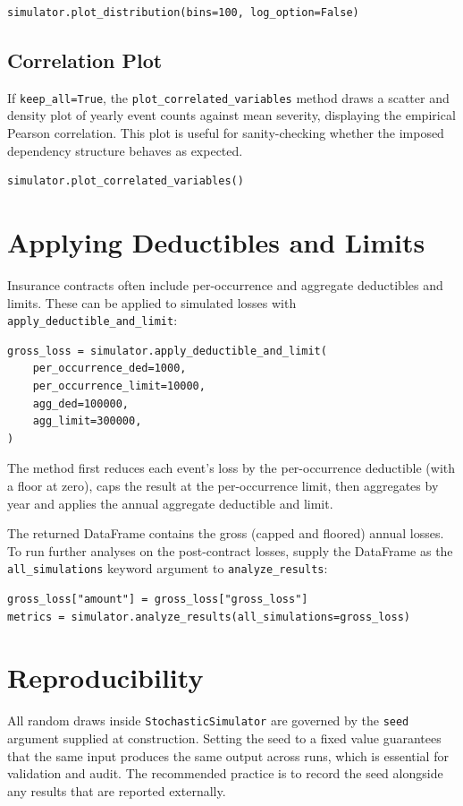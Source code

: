 \begin{lstlisting}[style=pythonstyle]
simulator.plot_distribution(bins=100, log_option=False)
\end{lstlisting}

\subsection{Correlation Plot}

If \texttt{keep\_all=True}, the \texttt{plot\_correlated\_variables}
method draws a scatter and density plot of yearly event counts against
mean severity, displaying the empirical Pearson correlation. This plot
is useful for sanity-checking whether the imposed dependency structure
behaves as expected.

\begin{lstlisting}[style=pythonstyle]
simulator.plot_correlated_variables()
\end{lstlisting}

\section{Applying Deductibles and Limits}
\label{sec:deductibles_and_limits}

Insurance contracts often include per-occurrence and aggregate
deductibles and limits. These can be applied to simulated losses with
\texttt{apply\_deductible\_and\_limit}:

\begin{lstlisting}[style=pythonstyle]
gross_loss = simulator.apply_deductible_and_limit(
    per_occurrence_ded=1000,
    per_occurrence_limit=10000,
    agg_ded=100000,
    agg_limit=300000,
)
\end{lstlisting}

The method first reduces each event's loss by the per-occurrence
deductible (with a floor at zero), caps the result at the per-occurrence
limit, then aggregates by year and applies the annual aggregate
deductible and limit.

The returned DataFrame contains the gross (capped and floored) annual
losses. To run further analyses on the post-contract losses, supply the
DataFrame as the \texttt{all\_simulations} keyword argument to
\texttt{analyze\_results}:

\begin{lstlisting}[style=pythonstyle]
gross_loss["amount"] = gross_loss["gross_loss"]
metrics = simulator.analyze_results(all_simulations=gross_loss)
\end{lstlisting}

\section{Reproducibility}

All random draws inside \texttt{StochasticSimulator} are governed by the
\texttt{seed} argument supplied at construction. Setting the seed to a
fixed value guarantees that the same input produces the same output
across runs, which is essential for validation and audit. The
recommended practice is to record the seed alongside any results that
are reported externally.
